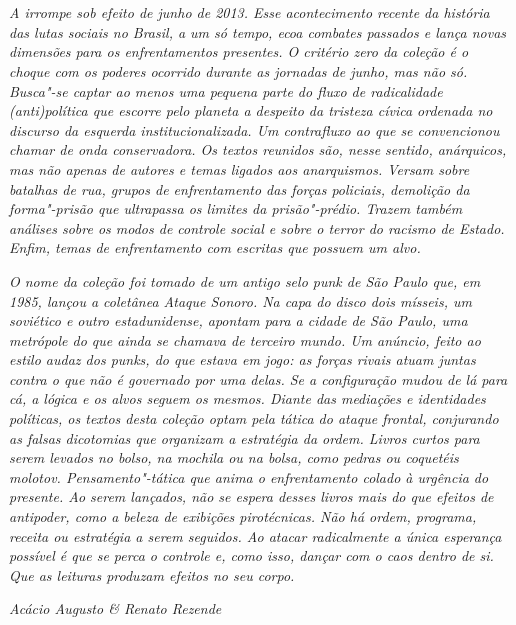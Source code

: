 \chapter*{}

\vspace*{\fill}

\begin{flushright}
\begin{adjustwidth}{2.0cm}{}
\raggedleft\scriptsize\emph{A  irrompe sob efeito de junho de 2013.
Esse acontecimento recente da história das lutas sociais no Brasil, a um só
tempo, ecoa combates passados e lança novas dimensões para os
enfrentamentos presentes. O critério zero da coleção é o choque com os
poderes ocorrido durante as \emph{jornadas de
junho}, mas não só. Busca"-se captar ao menos uma pequena parte do fluxo de
radicalidade (anti)política que escorre pelo planeta a despeito da
tristeza cívica ordenada no discurso da esquerda institucionalizada. Um
contrafluxo ao que se convencionou chamar de onda conservadora. Os
textos reunidos são, nesse sentido,
anárquicos, mas não apenas de autores e temas ligados aos
anarquismos. Versam sobre batalhas de
rua, grupos de enfrentamento das forças policiais, demolição da forma"-prisão que
ultrapassa os limites da prisão"-prédio. Trazem também análises sobre os
modos de controle social e sobre o terror do racismo de Estado. Enfim, temas de enfrentamento com
escritas que possuem um alvo.}

\emph{O nome da coleção foi tomado de um antigo
selo punk de São Paulo que, em 1985, lançou a coletânea \emph{Ataque
Sonoro}. Na capa do disco dois mísseis, um soviético e outro
estadunidense, apontam para a cidade de São Paulo, uma metrópole do que
ainda se chamava de terceiro mundo. Um anúncio, feito ao estilo audaz
dos punks, do que estava em jogo: as forças rivais atuam juntas contra o
que não é governado por uma delas. Se a configuração mudou de lá para
cá, a lógica e os alvos seguem os mesmos. Diante das mediações e
identidades políticas, os textos desta coleção optam pela tática do
ataque frontal, conjurando as falsas dicotomias que organizam a
estratégia da ordem. Livros curtos para serem levados no bolso, na
mochila ou na bolsa, como pedras ou coquetéis molotov.
Pensamento"-tática que anima o enfrentamento colado à urgência do
presente. Ao serem lançados, não se espera desses livros mais do que
efeitos de antipoder, como a beleza de exibições pirotécnicas. Não há
ordem, programa, receita ou estratégia a serem seguidos. Ao atacar
radicalmente a única esperança possível é que se perca o controle e,
como isso, dançar com o caos dentro de si. Que as leituras produzam
efeitos no seu corpo.}

\medskip

\emph{Acácio Augusto \& Renato Rezende}
\end{adjustwidth}
\end{flushright}
\thispagestyle{empty}

